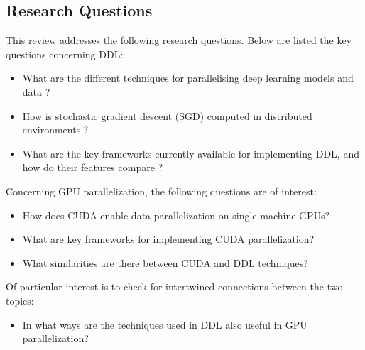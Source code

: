 \subsection{Research Questions}
\label{sec:research_questions}
This review addresses the following research questions. Below are listed the key questions concerning DDL:

\begin{itemize}
	\item What are the different techniques for parallelising deep learning models and data
	      \cite{berloco_systematic_2022, ben-nun_demystifying_2020, langer_distributed_2020}?
	\item How is stochastic gradient descent (SGD) computed in distributed environments
	      \cite{berloco_systematic_2022,ben-nun_demystifying_2020,langer_distributed_2020,verbraeken_survey_2021}? %
	\item What are the key frameworks currently available for implementing DDL, and how do their features
	      compare \cite{berloco_systematic_2022}?
\end{itemize}

Concerning GPU parallelization, the following questions are of interest: 
\begin{itemize}
	\item How does CUDA enable data parallelization on single-machine GPUs?
	\item What are key frameworks for implementing CUDA parallelization?
	\item What similarities are there between CUDA and DDL techniques?
\end{itemize}

Of particular interest is to check for intertwined connections between the two topics:
\begin{itemize}
	\item In what ways are the techniques used in DDL also useful in GPU parallelization?
\end{itemize}


